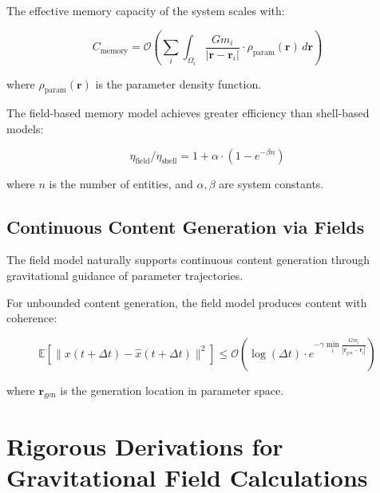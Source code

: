 \begin{theorem}
The effective memory capacity of the system scales with:

\begin{equation}
C_{\text{memory}} = \mathcal{O}\left(\sum_i \int_{\Omega_i} \frac{G m_i}{|\mathbf{r} - \mathbf{r}_i|} \cdot \rho_{\text{param}}(\mathbf{r}) \, d\mathbf{r}\right)
\end{equation}

where $\rho_{\text{param}}(\mathbf{r})$ is the parameter density function.
\end{theorem}

\begin{corollary}
The field-based memory model achieves greater efficiency than shell-based models:

\begin{equation}
\eta_{\text{field}} / \eta_{\text{shell}} = 1 + \alpha \cdot (1 - e^{-\beta n})
\end{equation}

where $n$ is the number of entities, and $\alpha, \beta$ are system constants.
\end{corollary}

\subsection{Continuous Content Generation via Fields}

The field model naturally supports continuous content generation through gravitational guidance of parameter trajectories.

\begin{theorem}
For unbounded content generation, the field model produces content with coherence:

\begin{equation}
\mathbb{E}[\|x(t+\Delta t) - \hat{x}(t+\Delta t)\|^2] \leq \mathcal{O}\left(\log(\Delta t) \cdot e^{-\gamma \min_i \frac{G m_i}{|\mathbf{r}_{\text{gen}} - \mathbf{r}_i|}}\right)
\end{equation}

where $\mathbf{r}_{\text{gen}}$ is the generation location in parameter space.
\end{theorem}

\section{Rigorous Derivations for Gravitational Field Calculations}

